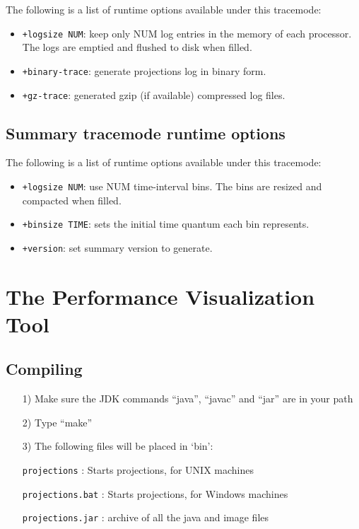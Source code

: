 \documentclass[10pt,dvips]{article}
\begin{document}
The following is a list of runtime options available under this tracemode:

\begin{itemize}
\item
{\tt +logsize NUM}:   keep only NUM log entries in the memory of each processor. The logs are emptied and flushed to disk when filled.
\item
{\tt +binary-trace}:  generate projections log in binary form.
\item
{\tt +gz-trace}:      generated gzip (if available) compressed log files.
\end{itemize}

\subsection{Summary tracemode runtime options}
\label{sec::summary runtime options}

The following is a list of runtime options available under this tracemode:

\begin{itemize}
\item
{\tt +logsize NUM}:   use NUM time-interval bins. The bins are resized and compacted when filled.
\item
{\tt +binsize TIME}:   sets the initial time quantum each bin represents.
\item
{\tt +version}:        set summary version to generate.
\end{itemize}

\section{The \projections{} Performance Visualization Tool}
\label{sec::visualization}

\subsection{Compiling \projections{}}
\begin{enumerate}
\item[1)]
   Make sure the JDK commands ``java'', ``javac'' and ``jar''
   are in your path
\item[2)]
   Type ``make''
\item[3)]
   The following files will be placed in `bin':

      {\tt projections}           : Starts projections, for UNIX machines

      {\tt projections.bat}       : Starts projections, for Windows machines

      {\tt projections.jar}       : archive of all the java and image files
\end{enumerate}
\end{document}
